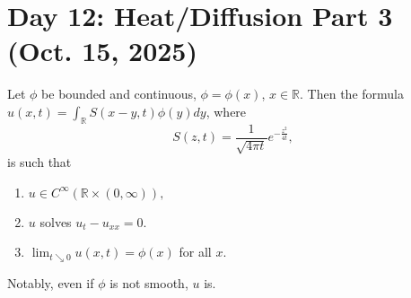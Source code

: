 \section{Day 12: Heat/Diffusion Part 3 (Oct. 15, 2025)}

\begin{theorem}
	Let \( \phi \) be bounded and continuous, \( \phi = \phi(x) \), \( x \in \mathbb{R} \). Then the formula \( u(x, t) = \int_{\mathbb{R}} S(x-y, t) \phi(y) dy \), where
	\[ S(z, t) = \frac{1}{\sqrt{4 \pi t}}e^{- \frac{z^{2}}{4t}}, \]
	is such that
	\begin{enumerate}
	
		\item \( u \in C^{\infty}(\mathbb{R} \times (0, \infty)), \)
		\item \( u \) solves \( u_{t} - u_{x x} = 0 \).
		\item \( \lim_{t \searrow 0} u(x, t) = \phi(x) \) for all \( x \).
	
	\end{enumerate}
	Notably, even if \( \phi \) is not smooth, \( u \) is.
\end{theorem}
